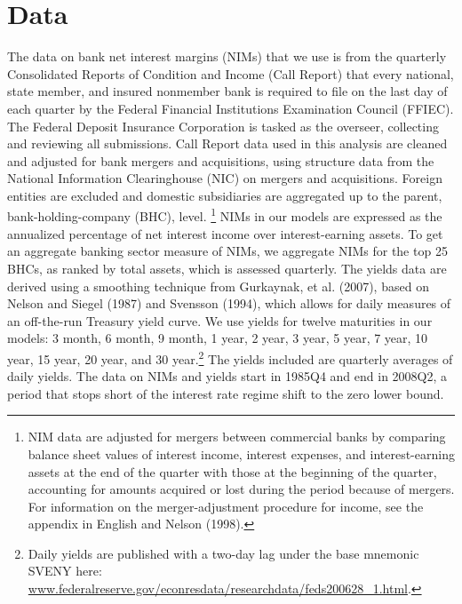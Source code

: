 \documentclass[12pt]{article}
\begin{document}
\section{Data}
The data on bank net interest margins (NIMs) that we use is from the quarterly Consolidated Reports of Condition and Income (Call Report) that every national, state member, and insured nonmember bank is required to file on the last day of each quarter by the Federal Financial Institutions Examination Council (FFIEC). The Federal Deposit Insurance Corporation is tasked as the overseer, collecting and reviewing all submissions. Call Report data used in this analysis are cleaned and adjusted for bank mergers and acquisitions, using structure data from the National Information Clearinghouse (NIC) on mergers and acquisitions. Foreign entities are excluded and domestic subsidiaries are aggregated up to the parent, bank-holding-company (BHC), level. \footnote{NIM data are adjusted for mergers between commercial banks by comparing balance sheet values of interest income, interest expenses, and interest-earning assets at the end of the quarter with those at the beginning of the quarter, accounting for amounts acquired or lost during the period because of mergers. For information on the merger-adjustment procedure for income, see the appendix in English and Nelson (1998).} \newline \newline
NIMs in our models are expressed as the annualized percentage of net interest income over interest-earning assets. To get an aggregate banking sector measure of NIMs, we aggregate NIMs for the top 25 BHCs, as ranked by total assets, which is assessed quarterly. \newline \newline
The yields data are derived using a smoothing technique from Gurkaynak, et al. (2007), based on Nelson and Siegel (1987) and Svensson (1994), which allows for daily measures of an off-the-run Treasury yield curve. We use yields for twelve maturities in our models: 3 month, 6 month, 9 month, 1 year, 2 year, 3 year, 5 year, 7 year, 10 year, 15 year, 20 year, and 30 year.\footnote{Daily yields are published with a two-day lag under the base mnemonic SVENY here: \url{www.federalreserve.gov/econresdata/researchdata/feds200628_1.html}.} The yields included are quarterly averages of daily yields.  \newline \newline
The data on NIMs and yields start in 1985Q4 and end in 2008Q2, a period that stops short of the interest rate regime shift to the zero lower bound.
\end{document}
